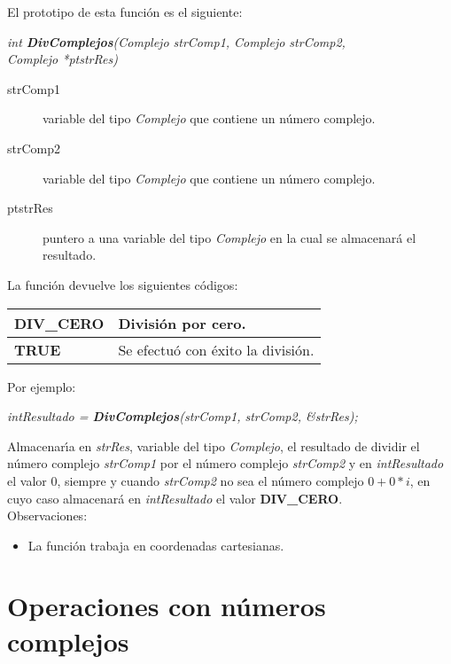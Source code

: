 El prototipo de esta funci\'on es el siguiente:

\begin{center}
\emph{int \textbf{DivComplejos}(Complejo strComp1, Complejo strComp2,\\
Complejo *ptstrRes)}
\end{center}

\begin{description}
\item[strComp1] variable del tipo \emph{Complejo} que contiene un n\'umero 
complejo.
\item[strComp2] variable del tipo \emph{Complejo} que contiene un n\'umero
complejo.
\item[ptstrRes] puntero a una variable del tipo \emph{Complejo} en la cual
se almacenar\'a el resultado.
\end{description}

La funci\'on devuelve los siguientes c\'odigos:

\begin{center}
\begin{tabular}{|l|l|}
\hline
\textbf{DIV\_CERO} & Divisi\'on por cero. \\
\hline
\textbf{TRUE} & Se efectu\'o con \'exito la divisi\'on. \\
\hline
\end{tabular}
\end{center} 

Por ejemplo:

\begin{center}
\emph{intResultado = \textbf{DivComplejos}(strComp1, strComp2, \&strRes);}
\end{center}

Almacenar\'{\i}a en \emph{strRes}, variable del tipo \emph{Complejo}, el
resultado de dividir el n\'umero complejo \emph{strComp1} por el n\'umero 
complejo \emph{strComp2} y en \emph{intResultado} el valor $0$, siempre y cuando
\emph{strComp2} no sea el n\'umero complejo $0+0*i$, en cuyo caso almacenar\'a
en \emph{intResultado} el valor \textbf{DIV\_CERO}.\\

Observaciones:

\begin{itemize}
\item La funci\'on trabaja en coordenadas cartesianas.
\end{itemize}

\newpage

\section{Operaciones con n\'umeros complejos}

